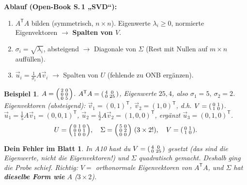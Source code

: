\documentclass[a4paper,11pt]{article}
\newenvironment{psmallmatrix}{\left(\begin{smallmatrix}}{\end{smallmatrix}\right)}
\newcommand{\transp}{^{\mathsf{T}}}
\theoremstyle{def0}
\newtheorem*{fehler}{\textcolor{bad}{Dein Fehler im Blatt}}
\newtheorem*{bsp}{Beispiel}
\begin{document}
\textbf{Ablauf (Open-Book S.\,1 „SVD“):}
\begin{enumerate}[noitemsep]
  \item $A\transp A$ bilden (symmetrisch, $n\times n$). Eigenwerte $\lambda_i\ge0$,
        normierte Eigenvektoren $\to$ \textbf{Spalten von $V$}.
  \item $\sigma_i=\sqrt{\lambda_i}$, absteigend $\to$ Diagonale von $\Sigma$ (Rest mit
        Nullen auf $m\times n$ auffüllen).
  \item $\vec u_i = \tfrac{1}{\sigma_i}A\vec v_i$ $\to$ Spalten von $U$ (fehlende zu ONB
        ergänzen).
\end{enumerate}

\begin{bsp}
$A=\begin{psmallmatrix}2&0\\0&0\\0&5\end{psmallmatrix}$.\;
$A\transp A=\begin{psmallmatrix}4&0\\0&25\end{psmallmatrix}$,
Eigenwerte $25,4$, also $\sigma_1=5,\ \sigma_2=2$.
Eigenvektoren (absteigend): $\vec v_1=(0,1)\transp$, $\vec v_2=(1,0)\transp$, d.h.
$V=\begin{psmallmatrix}0&1\\1&0\end{psmallmatrix}$.\;
$\vec u_1=\tfrac15A\vec v_1=(0,0,1)\transp$, $\vec u_2=\tfrac12A\vec v_2=(1,0,0)\transp$,
ergänzt $\vec u_3=(0,1,0)\transp$.
\[
U=\begin{psmallmatrix}0&1&0\\0&0&1\\1&0&0\end{psmallmatrix},\quad
\Sigma=\begin{psmallmatrix}5&0\\0&2\\0&0\end{psmallmatrix}\ (3\times2!),\quad
V=\begin{psmallmatrix}0&1\\1&0\end{psmallmatrix}.
\]
\end{bsp}

\begin{fehler}
In A10 hast du $V=\begin{psmallmatrix}4&0\\0&25\end{psmallmatrix}$ gesetzt (das sind die
\emph{Eigenwerte}, nicht die Eigenvektoren!) und $\Sigma$ quadratisch gemacht. Deshalb
ging die Probe schief. Richtig: $V=$ orthonormale Eigenvektoren von $A\transp A$, und
$\Sigma$ hat \textbf{dieselbe Form wie} $A$ ($3\times2$).
\end{fehler}
\end{document}
